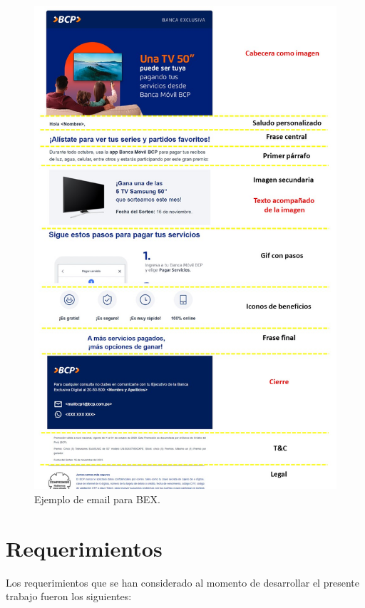 \begin{figure}[!htpb]
     \centering
     \includegraphics[width=1\textwidth]{./Figures/ejemplo_BEX}
     \caption{Ejemplo de email para BEX.}
     \label{fig:EjBEX}
\end{figure}


\section{Requerimientos}

Los requerimientos que se han considerado al momento de desarrollar el presente trabajo fueron los siguientes:

